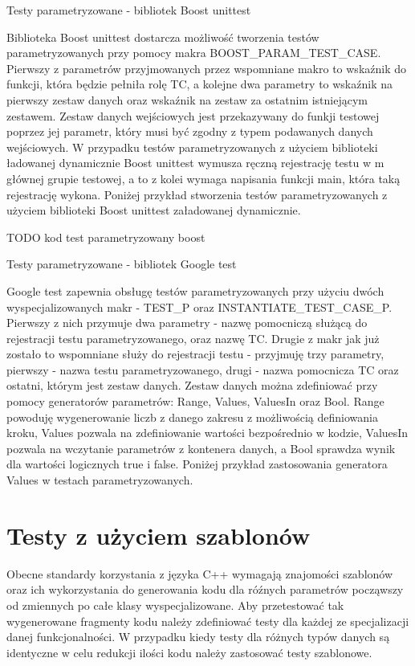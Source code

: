 \documentclass[12pt,a4paper,notitlepage]{report}
\begin{document}
Testy parametryzowane - bibliotek Boost unittest

Biblioteka Boost unittest dostarcza możliwość tworzenia testów parametryzowanych przy pomocy makra BOOST_PARAM_TEST_CASE.
Pierwszy z parametrów przyjmowanych przez wspomniane makro to wskaźnik do funkcji, która będzie pełniła rolę TC, a kolejne dwa parametry to wskaźnik na pierwszy zestaw danych oraz wskaźnik na zestaw za ostatnim istniejącym zestawem.
Zestaw danych wejściowych jest przekazywany do funkji testowej poprzez jej parametr, który musi być zgodny z typem podawanych danych wejściowych.
W przypadku testów parametryzowanych z użyciem biblioteki ładowanej dynamicznie Boost unittest wymusza ręczną rejestrację testu w m głównej grupie testowej, a to z kolei wymaga napisania funkcji main, która taką rejestrację wykona.
Poniżej przykład stworzenia testów parametryzowanych z użyciem biblioteki Boost unittest załadowanej dynamicznie.

TODO kod test parametryzowany boost

Testy parametryzowane - bibliotek Google test

Google test zapewnia obsługę testów parametryzowanych przy użyciu dwóch wyspecjalizowanych makr - TEST_P oraz INSTANTIATE_TEST_CASE_P.
Pierwszy z nich przymuje dwa parametry - nazwę pomocniczą służącą do rejestracji testu parametryzowanego, oraz nazwę TC. Drugie z makr jak już zostało to wspomniane służy do rejestracji testu  - przyjmuję trzy parametry, pierwszy - nazwa testu parametryzowanego, drugi - nazwa pomocnicza TC oraz ostatni, którym jest zestaw danych.
Zestaw danych można zdefiniować przy pomocy generatorów parametrów: Range, Values, ValuesIn oraz Bool. Range powoduję wygenerowanie liczb z danego zakresu z możliwością definiowania kroku, Values pozwala na zdefiniowanie wartości bezpośrednio w kodzie, ValuesIn pozwala na wczytanie parametrów z kontenera danych, a Bool sprawdza wynik dla wartości logicznych true i false.
Poniżej przykład zastosowania generatora Values w testach parametryzowanych.

\chapter{Testy z użyciem szablonów}

Obecne standardy korzystania z języka C++ wymagają znajomości szablonów oraz ich wykorzystania do generowania kodu dla róźnych parametrów począwszy od zmiennych po całe klasy wyspecjalizowane. Aby przetestować tak wygenerowane fragmenty kodu należy zdefiniować testy dla każdej ze specjalizacji danej funkcjonalności.
W przypadku kiedy testy dla różnych typów danych są identyczne w celu redukcji ilości kodu należy zastosować testy szablonowe.
\end{document}
